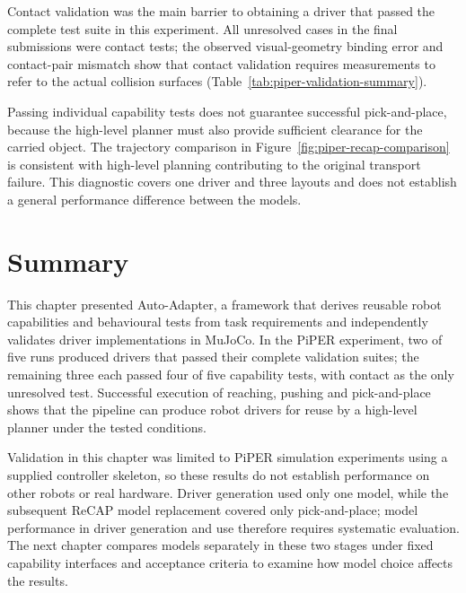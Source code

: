 Contact validation was the main barrier to obtaining a driver that passed the
complete test suite in this experiment. All unresolved cases in the final
submissions were contact tests; the observed visual-geometry binding error
and contact-pair mismatch show that contact validation requires measurements
to refer to the actual collision surfaces
(Table~\ref{tab:piper-validation-summary}).

Passing individual capability tests does not guarantee successful
pick-and-place, because the high-level planner must also provide sufficient
clearance for the carried object. The trajectory comparison in
Figure~\ref{fig:piper-recap-comparison} is consistent with high-level planning
contributing to the original transport failure. This diagnostic covers one
driver and three layouts and does not establish a general performance
difference between the models.

\section{Summary}

This chapter presented Auto-Adapter, a framework that derives reusable robot
capabilities and behavioural tests from task requirements and independently
validates driver implementations in MuJoCo. In the PiPER experiment, two of
five runs produced drivers that passed their complete validation suites; the
remaining three each passed four of five capability tests, with contact as
the only unresolved test. Successful execution of reaching, pushing and
pick-and-place shows that the pipeline can produce robot drivers for reuse
by a high-level planner under the tested conditions.

Validation in this chapter was limited to PiPER simulation experiments using
a supplied controller skeleton, so these results do not establish performance
on other robots or real hardware. Driver generation used only one model,
while the subsequent ReCAP model replacement covered only pick-and-place;
model performance in driver generation and use therefore requires systematic
evaluation. The next chapter compares models separately in these two
stages under fixed capability interfaces and acceptance criteria to examine
how model choice affects the results.
